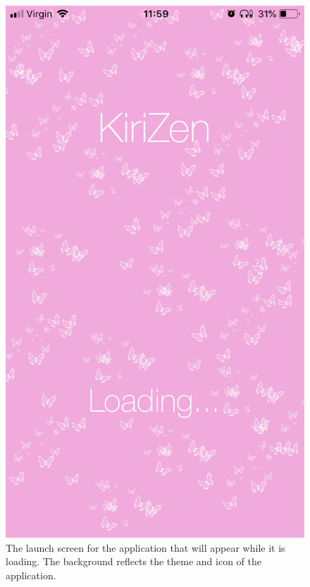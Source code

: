 \documentclass[11pt]{article}
\begin{document}
                    \begin{figure}[!ht]
                        \begin{minipage}{0.45\textwidth}
                            \centering \includegraphics[width=0.7\linewidth]{KiriZen/launchPage}
                            \caption{The launch screen for the application that will appear while it is loading. The background reflects the theme and icon of the application.}
                            \label{fig:kiriZen-launch}
                        \end{minipage}\hfill
                        \begin{minipage}{0.45\textwidth}
                            \centering

\end{minipage}
\end{figure}
\end{document}
